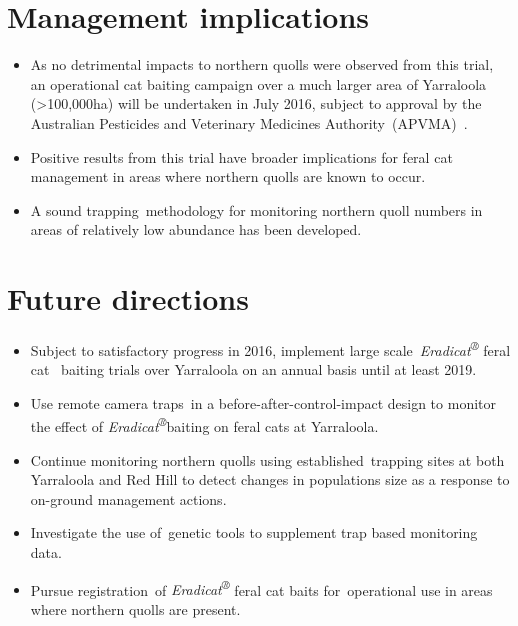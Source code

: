 \documentclass[version=last,
    paper=a4, %
    10pt, %
    usenames,
    dvipsnames,
    oneside, %
    headings=openany, %
    DIV=15 %
]{scrbook}
\begin{document}
\section*{Management implications}
\begin{itemize}
\itemsep1pt\parskip0pt
\item
  As no detrimental impacts to northern quolls were observed from this
  trial, an operational cat baiting campaign over a much larger area of
  Yarraloola (\textgreater{}100,000ha) will be undertaken in July 2016,
  subject to approval by the Australian Pesticides and Veterinary
  Medicines Authority~(APVMA)~.
\item
  Positive results from this trial have broader implications for feral
  cat management in areas where northern quolls are known to occur.
\item
  A sound trapping~methodology for monitoring northern quoll numbers in
  areas of relatively low abundance has been developed.
\end{itemize}



\section*{Future directions}
\begin{itemize}
\itemsep1pt\parskip0pt
\item
  Subject to satisfactory progress in 2016, implement large
  scale~\emph{Eradicat\textsuperscript{®}} feral cat~ baiting trials
  over Yarraloola on an annual basis until at least 2019.
\item
  Use remote camera traps~in a before-after-control-impact design to
  monitor the effect of \emph{Eradicat\textsuperscript{®}}baiting on
  feral cats at Yarraloola.
\item
  Continue monitoring northern quolls using established~trapping sites
  at both Yarraloola and Red Hill to detect changes in populations size
  as a response to on-ground management actions.
\item
  Investigate the use of~genetic tools to supplement trap based
  monitoring data.
\item
  Pursue registration~of \emph{Eradicat\textsuperscript{®}} feral cat
  baits for~operational use in areas where northern quolls are present.
\end{itemize}



\end{document}
